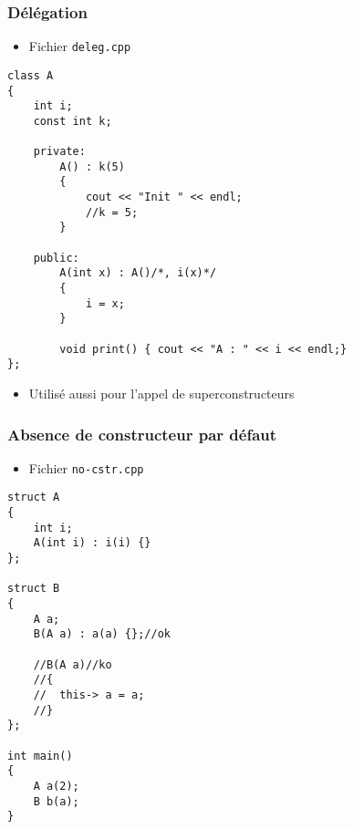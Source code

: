 \begin{frame}[containsverbatim]
\frametitle{Délégation}
\begin{itemize}
\item Fichier \texttt{deleg.cpp}
\end{itemize}
\begin{lstlisting}
class A
{	
	int i;
	const int k;

	private:
		A() : k(5)
		{
			cout << "Init " << endl;
			//k = 5;
		}	
	
	public:
		A(int x) : A()/*, i(x)*/ 
		{
			i = x;
		}

		void print() { cout << "A : " << i << endl;}
};
\end{lstlisting}
\begin{itemize}
\item Utilisé aussi pour l'appel de superconstructeurs
\end{itemize}
\end{frame}

\begin{frame}[containsverbatim]
\frametitle{Absence de constructeur par défaut}
\begin{itemize}
\item Fichier \texttt{no-cstr.cpp}
\end{itemize}
\begin{lstlisting}
struct A
{
	int i;	
	A(int i) : i(i) {}
};

struct B
{
	A a;
	B(A a) : a(a) {};//ok		
	
	//B(A a)//ko
	//{
	//	this-> a = a;
	//}
};

int main()
{	
	A a(2);
	B b(a);
}
\end{lstlisting}
\end{frame}

